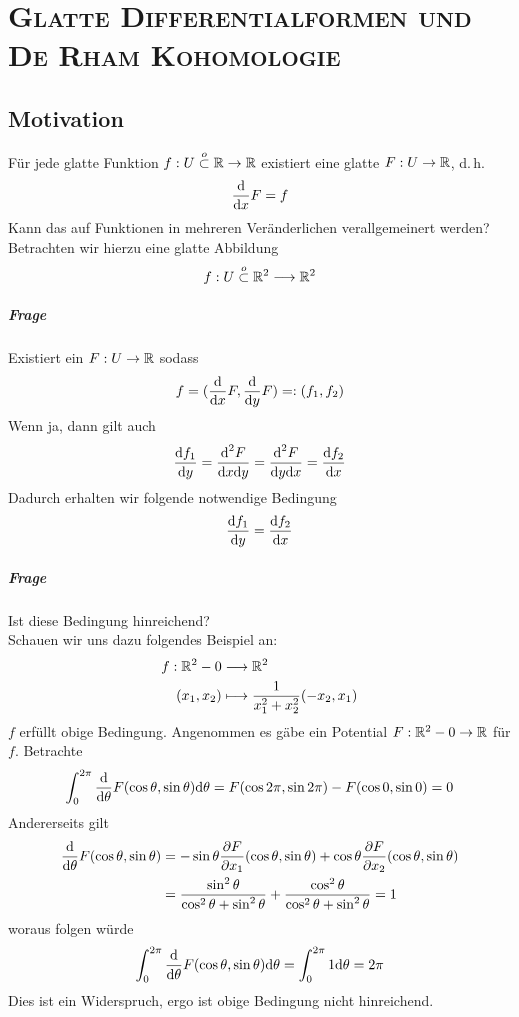 \chapter[\textsc{De Rham Kohomologie}]{{\textsc{Glatte Differentialformen und De Rham Kohomologie}}}

\section*{Motivation}
Für jede glatte Funktion $f : U\overset{o}{\subset} \mathbb{R} \overset{}{\rightarrow} \mathbb{R}$ existiert eine glatte  $F : U \overset{}{\rightarrow} \mathbb{R}$, d.\,h.
\[ \frac{\text{d}}{\text{d} x} F = f \]
Kann das auf Funktionen in mehreren Veränderlichen verallgemeinert werden?\\
Betrachten wir hierzu eine glatte Abbildung
\[ f : U \overset{o}{\subset} \mathbb{R}^2 \overset{}{\longrightarrow} \mathbb{R}^2 \]
\paragraph{Frage} Existiert ein  $F : U \overset{}{\rightarrow} \mathbb{R}$ sodass
\[ f = (\frac{\text{d}}{\text{d} x} F, \frac{\text{d}}{\text{d} y} F) =: (f_1, f_2) \]
Wenn ja, dann gilt auch
\[ \frac{\text{d} f_1}{\text{d} y} = \frac{\text{d}^2 F}{\text{d} x\text{d} y} = \frac{\text{d}^2 F}{\text{d} y\text{d} x} =  \frac{\text{d} f_2}{\text{d} x}  \]
Dadurch erhalten wir folgende notwendige Bedingung
\[ \frac{\text{d} f_1}{\text{d} y} = \frac{\text{d} f_2}{\text{d} x} \]
\paragraph{Frage} Ist diese Bedingung hinreichend?\\
Schauen wir uns dazu folgendes Beispiel an:
\begin{align*}
f : \mathbb{R}^2 - 0 & \overset{}{\longrightarrow} \mathbb{R}^2\\
(x_1, x_2) & \longmapsto \frac{1}{x_1^2 + x_2^2}(-x_2, x_1)
\end{align*}
$f$ erfüllt obige Bedingung. Angenommen es gäbe ein Potential $F : \mathbb{R}^2 - 0 \overset{}{\rightarrow} \mathbb{R}$ für $f$. Betrachte
\[ \int_{0}^{2\pi} \frac{\text{d}}{\text{d} \theta} F(\cos \theta, \sin \theta) \text{d} \theta = F(\cos 2\pi , \sin 2\pi) - F(\cos 0, \sin 0) = 0 \]
Andererseits gilt
\begin{align*}
\frac{\text{d}}{\text{d} \theta} F(\cos \theta, \sin \theta) &= - \sin \theta\frac{\partial F}{\partial x_1}(\cos \theta, \sin \theta) + 
\cos \theta\frac{\partial F}{\partial x_2}(\cos \theta, \sin \theta)\\
& = \frac{\sin^2 \theta}{\cos^2 \theta + \sin^2 \theta} +  \frac{\cos^2 \theta}{\cos^2 \theta + \sin^2 \theta} =1
\end{align*}
woraus folgen würde
\[\int_{0}^{2\pi} \frac{\text{d}}{\text{d} \theta} F(\cos \theta, \sin \theta) \text{d} \theta = \int_{0}^{2\pi} 1 \text{d} \theta = 2\pi \]
Dies ist ein Widerspruch, ergo ist obige Bedingung nicht hinreichend.

